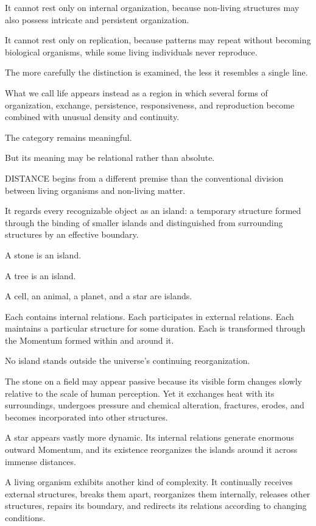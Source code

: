 It cannot rest only on internal organization, because non-living structures may also possess intricate and persistent organization.

It cannot rest only on replication, because patterns may repeat without becoming biological organisms, while some living individuals never reproduce.

The more carefully the distinction is examined, the less it resembles a single line.

What we call life appears instead as a region in which several forms of organization, exchange, persistence, responsiveness, and reproduction become combined with unusual density and continuity.

The category remains meaningful.

But its meaning may be relational rather than absolute.

DISTANCE begins from a different premise than the conventional division between living organisms and non-living matter.

It regards every recognizable object as an island: a temporary structure formed through the binding of smaller islands and distinguished from surrounding structures by an effective boundary.

A stone is an island.

A tree is an island.

A cell, an animal, a planet, and a star are islands.

Each contains internal relations. Each participates in external relations. Each maintains a particular structure for some duration. Each is transformed through the Momentum formed within and around it.

No island stands outside the universe’s continuing reorganization.

The stone on a field may appear passive because its visible form changes slowly relative to the scale of human perception. Yet it exchanges heat with its surroundings, undergoes pressure and chemical alteration, fractures, erodes, and becomes incorporated into other structures.

A star appears vastly more dynamic. Its internal relations generate enormous outward Momentum, and its existence reorganizes the islands around it across immense distances.

A living organism exhibits another kind of complexity. It continually receives external structures, breaks them apart, reorganizes them internally, releases other structures, repairs its boundary, and redirects its relations according to changing conditions.

